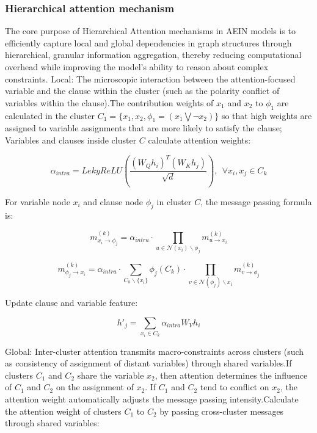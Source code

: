 \subsubsection{Hierarchical attention mechanism}
The core purpose of Hierarchical Attention mechanisms in AEIN models is to efficiently capture local and global dependencies 
in graph structures through hierarchical, granular information aggregation, thereby reducing computational overhead while 
improving the model's ability to reason about complex constraints.
Local: The microscopic interaction between the attention-focused variable and the clause within the cluster (such as the polarity 
conflict of variables within the clause).The contribution weights of \(x_1\) and \(x_2\) to \(\phi_1\) are calculated in the 
cluster \(C_1=\{x_1,x_2,\phi_1=(x_1\bigvee \lnot x_2)\}\) so that high weights are assigned to variable assignments that are 
more likely to satisfy the clause;
Variables and clauses inside cluster \(C\) calculate attention weights:

\begin{equation}
\alpha_{intra}=LekyReLU(\frac{(W_Qh_i)^T(W_Kh_j)}{\sqrt{d}}),\ \ \forall x_i,x_j\in C_k
\end{equation}

For variable node \(x_i\) and clause node \(\phi_j\) in cluster \(C\), the message passing formula is:

\begin{equation}
    m_{x_i\rightarrow \phi_j}^{(k)}=\alpha_{intra}\cdot \prod_{u\in \mathcal N(x_i)\backslash \phi_j}m_{u\rightarrow x_i}^{(k)}
\end{equation}

\begin{equation}
     m_{\phi_j\rightarrow x_i}^{(k)}=\alpha_{intra}\cdot\sum_{C_k \backslash \{x_i\}}\phi_j(C_k)\cdot\prod_{v\in \mathcal{N}(\phi_j)\backslash x_i}m_{v\rightarrow \phi_j}^{(k)}
\end{equation}

Update clause and variable feature:

\begin{equation}
h'_j=\sum_{x_i\in C_k}\alpha_{intra}W_Vh_i
\end{equation}

Global: Inter-cluster attention transmits macro-constraints across clusters (such as consistency of assignment of distant 
variables) through shared variables.If clusters \(C_1\) and \(C_2\) share the variable \(x_2\), then attention determines 
the influence of \(C_1\) and \(C_2\) on the assignment of \(x_2\). If \(C_1\) and \(C_2\) tend to conflict on \(x_2\), 
the attention weight automatically adjusts the message passing intensity.Calculate the attention weight of clusters 
\(C_1\)  to \(C_2\)  by passing cross-cluster messages through shared variables:

